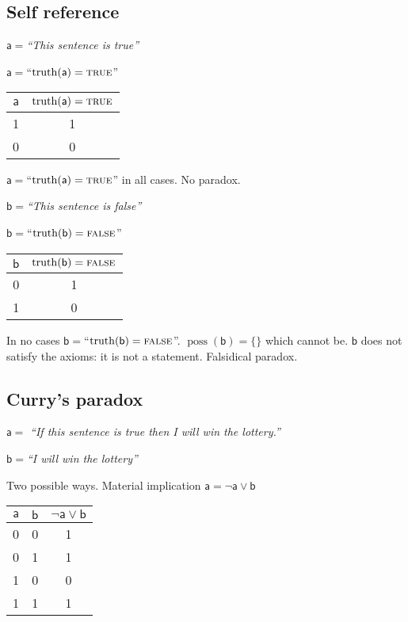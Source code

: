\documentclass[letterpaper]{article}
\theoremstyle{plain}%
\theoremstyle{definition}
\theoremstyle{remark}
\DeclareMathOperator{\truth}{truth}
\DeclareMathOperator{\possFn}{poss}
\def\TRUE{\textsc{true}}
\def\FALSE{\textsc{false}}
\def\OR{\vee}
\def\NOT{\neg}
\newcommand{\stmt}[1][s] {\mathsf{#1}}
\newcommand{\statement}[1] {\emph{``#1''}}
\begin{document}
\subsection{Self reference}

$\stmt[a]=$\statement{This sentence is true}

$\stmt[a]=$``$\truth(\stmt[a]) = \TRUE$''


\begin{table}[h]
	\centering
	\begin{tabular}{c|c}
		
		$\stmt[a]$ & $\truth(\stmt[a]) = \TRUE$ \\
		\hline
		1 & 1 \\
		\hline
		0 & 0 \\ 
	\end{tabular}
\end{table}

$\stmt[a]=$``$\truth(\stmt[a]) = \TRUE$'' in all cases. No paradox.

$\stmt[b]=$\statement{This sentence is false}

$\stmt[b]=$``$\truth(\stmt[b]) = \FALSE$''

\begin{table}[h]
	\centering
	\begin{tabular}{c|c}
		
		$\stmt[b]$ & $\truth(\stmt[b]) = \FALSE$ \\
		\hline
		0 & 1 \\
		\hline
		1 & 0 \\ 
	\end{tabular}
\end{table}

In no cases $\stmt[b]=$``$\truth(\stmt[b]) = \FALSE$''. $\possFn(\stmt[b]) = \{\}$ which cannot be. $\stmt[b]$ does not satisfy the axioms: it is not a statement. Falsidical paradox.

\subsection{Curry's paradox}

$\stmt[a]=$ \statement{If this sentence is true then I will win the lottery.}

$\stmt[b]=$\statement{I will win the lottery}

Two possible ways. Material implication $\stmt[a]=\NOT \stmt[a] \OR \stmt[b]$

\begin{table}[h]
	\centering
	\begin{tabular}{c|c|c}
		
		$\stmt[a]$ & $\stmt[b]$ & $\NOT \stmt[a] \OR \stmt[b]$ \\
		\hline
		0 & 0 & 1 \\
		\hline
		0 & 1 & 1 \\
		\hline
		1 & 0 & 0 \\ 
		\hline
		1 & 1 & 1 \\ 
	\end{tabular}
\end{table}
\end{document}

